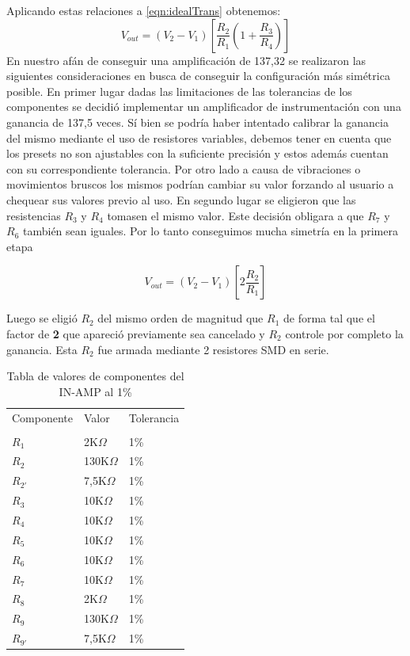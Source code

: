 	Aplicando estas relaciones a \eqref{eqn:idealTrans} obtenemos:
	\begin{equation}
		V_{out} = (V_2-V_1)\left[\frac{R_2}{R_1}(1+\frac{R_3}{R_4})\right]
	\end{equation}
En nuestro afán de conseguir una amplificación de 137,32 se realizaron las siguientes consideraciones en busca de conseguir la configuración más simétrica posible.
En primer lugar dadas las limitaciones de las tolerancias de los componentes se decidió implementar un amplificador de instrumentación con una ganancia de 137,5 veces. Sí bien se podría haber intentado calibrar la ganancia del mismo mediante el uso de resistores variables, debemos tener en cuenta que los presets no son ajustables con la suficiente precisión y estos además cuentan con su correspondiente tolerancia. Por otro lado a causa de vibraciones o movimientos bruscos los mismos podrían cambiar su valor forzando al usuario a chequear sus valores previo al uso. 
En segundo lugar se eligieron que las resistencias $R_3$ y  $R_4$ tomasen el mismo valor. Este decisión obligara a que $R_7$ y  $R_6$ también sean iguales. Por lo tanto conseguimos mucha simetría en la primera etapa

\begin{equation}
	V_{out} = (V_2-V_1)\left[2 \frac{R_2}{R_1}\right]
\end{equation}

Luego se eligió $R_2$ del mismo orden de magnitud que $R_1$ de forma tal que el factor de \textbf{2} que apareció previamente sea cancelado y $R_2$ controle por completo la ganancia. Esta $R_2$ fue armada mediante 2 resistores SMD en serie.

\begin{table}[H]
	\centering
	\begin{tabular}{lll}
		Componente  & Valor        	   & Tolerancia \\
		\\
		$R_1$       & 2K$\Omega$   	   & 1\%        \\
		$R_2$       & 130K$\Omega$ 	   & 1\%        \\
		$R_{2'}$  	& 7,5K$\Omega$     & 1\%        \\
		$R_3$ 		& 10K$\Omega$      & 1\%		\\
		$R_4$		& 10K$\Omega$      & 1\%        \\
	    $R_5$		& 10K$\Omega$      & 1\%        \\
	    $R_6$		& 10K$\Omega$      & 1\%        \\
	    $R_7$		& 10K$\Omega$      & 1\%        \\
	    $R_8$		& 2K$\Omega$       & 1\%        \\
 	    $R_9$		& 130K$\Omega$     & 1\%        \\   
		$R_{9'}$	& 7,5K$\Omega$     & 1\%        \\
			\end{tabular}
		\caption{Tabla de valores de componentes del IN-AMP al 1\%}
\end{table}

